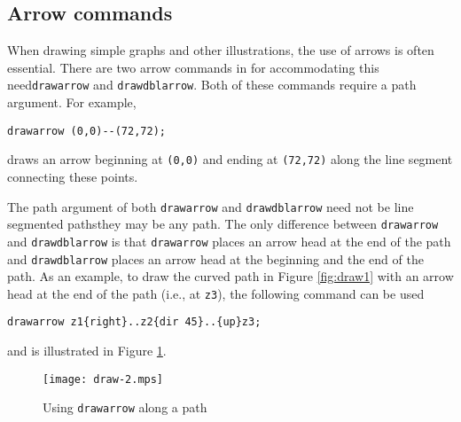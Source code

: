 \subsection{Arrow commands}

When drawing simple graphs and other illustrations, the use of arrows is
often essential.  There are two arrow commands in \MP{} for
accommodating this need\Dash \texttt{drawarrow} and
\texttt{drawdblarrow}.  Both of these commands require a path argument.
For example,

\begin{center}
  \verb|drawarrow (0,0)--(72,72);|
\end{center}
draws an arrow beginning at \verb|(0,0)| and ending at \verb|(72,72)|
along the line segment connecting these points.

The path argument of both \texttt{drawarrow} and \texttt{drawdblarrow}
need not be line segmented paths\Dash they may be any \MP{} path.  The
only difference between \texttt{drawarrow} and \texttt{drawdblarrow} is
that \texttt{drawarrow} places an arrow head at the end of the path and
\texttt{drawdblarrow} places an arrow head at the beginning and the end
of the path.  As an example, to draw the curved path in Figure
\ref{fig:draw1} with an arrow head at the end of the path (i.e., at
\texttt{z3}), the following command can be used

\begin{center}
  \verb|drawarrow z1{right}..z2{dir 45}..{up}z3;|
\end{center}
and is illustrated in Figure \ref{fig:draw2}.

\begin{figure}
  \centering
  \texttt{[image: draw-2.mps]}
  \caption{Using \texttt{drawarrow} along a path}
  \label{fig:draw2}
\end{figure}

